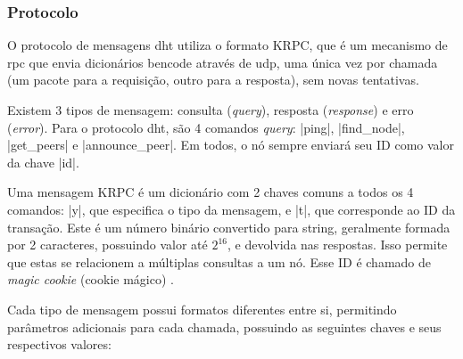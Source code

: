 
\subsubsection*{Protocolo}

O protocolo de mensagens \gls*{dht} utiliza o formato KRPC, que é um mecanismo de
\gls{rpc} que envia dicionários \gls*{bencode} através de \gls*{udp}, uma única
vez por chamada (um pacote para a requisição, outro para a resposta), sem novas
tentativas.

Existem 3 tipos de mensagem: consulta (\emph{query}), resposta (\emph{response}) e erro
(\emph{error}). Para o protocolo \gls*{dht}, são 4 comandos \emph{query}: \bverb|ping|,
\bverb|find_node|, \bverb|get_peers| e \bverb|announce_peer|. Em todos, o nó sempre
enviará seu ID como valor da chave \bverb|id|.

Uma mensagem KRPC é um dicionário com 2 chaves comuns a todos os 4 comandos: \bverb|y|,
que especifica o tipo da mensagem, e \bverb|t|, que corresponde ao ID da transação.
Este é um número binário convertido para \gls*{string}, geralmente formada por 2
caracteres, possuindo valor até $2^{16}$, e devolvida nas respostas. Isso permite que
estas se relacionem a múltiplas consultas a um nó. Esse ID é chamado de \emph{magic
\gls{cookie}} (cookie mágico) \cite{wiki:magic-cookie}.

Cada tipo de mensagem possui formatos diferentes entre si, permitindo parâmetros
adicionais para cada chamada, possuindo as seguintes chaves e seus respectivos valores:

